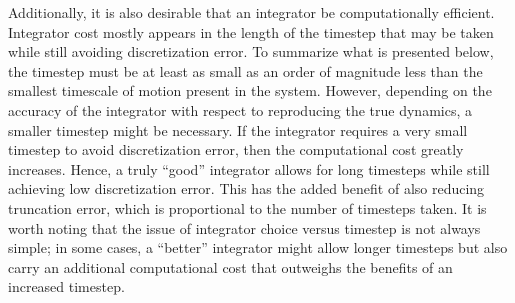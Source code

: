 \documentclass[9pt,bestpractices]{livecoms}
\begin{document}
Additionally, it is also desirable that an integrator be computationally efficient.
Integrator cost mostly appears in the length of the timestep that may be taken while still avoiding discretization error. 
To summarize what is presented below, the timestep must be at least as small as an order of magnitude less than the smallest timescale of motion present in the system.
However, depending on the accuracy of the integrator with respect to reproducing the true dynamics, a smaller timestep might be necessary.
If the integrator requires a very small timestep to avoid discretization error, then the computational cost greatly increases.
Hence, a truly ``good'' integrator allows for long timesteps while still achieving low discretization error.
This has the added benefit of also reducing truncation error, which is proportional to the number of timesteps taken.
It is worth noting that the issue of integrator choice versus timestep is not always simple; in some cases, a ``better'' integrator might allow longer timesteps but also carry an additional computational cost that outweighs the benefits of an increased timestep.
\end{document}
